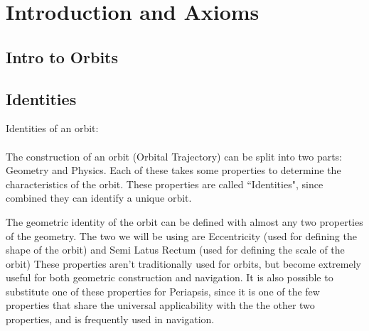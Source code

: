 \chapter{Introduction and Axioms}
\section{Intro to Orbits}

\section{Identities}

    Identities of an orbit:\\\\
    
    The construction of an orbit (Orbital  Trajectory) can be split into two parts: Geometry and Physics. Each of these takes some properties to determine the characteristics of the orbit. These properties are called ``Identities", since combined they can identify a unique orbit.
    
    The geometric identity of the orbit can be defined with almost any two properties of the geometry. The two we will be using are Eccentricity (used for defining the shape of the orbit) and Semi Latus Rectum (used for defining the scale of the orbit) These properties aren't traditionally used for orbits, but become extremely useful for both geometric construction and navigation. It is also possible to substitute one of these properties for Periapsis, since it is one of the few properties that share the universal applicability with the the other two properties, and is frequently used in navigation.
    
